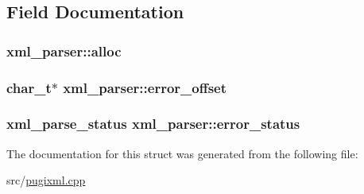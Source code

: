 \subsection{Field Documentation}
\hypertarget{structxml__parser_a213cf019cbf45f5049acdcae296a2976}{
\subsubsection[{alloc}]{ {\bf xml\_\-parser::alloc}}}
\label{structxml__parser_a213cf019cbf45f5049acdcae296a2976}
\hypertarget{structxml__parser_a2476a71cd7e67b3f4bdbcd1323524503}{
\subsubsection[{error\_\-offset}]{\setlength{\rightskip}{0pt plus 5cm}char\_\-t$\ast$ {\bf xml\_\-parser::error\_\-offset}}}
\label{structxml__parser_a2476a71cd7e67b3f4bdbcd1323524503}
\hypertarget{structxml__parser_a0555859911674e5a7a349447d6533383}{
\subsubsection[{error\_\-status}]{\setlength{\rightskip}{0pt plus 5cm}xml\_\-parse\_\-status {\bf xml\_\-parser::error\_\-status}}}
\label{structxml__parser_a0555859911674e5a7a349447d6533383}


The documentation for this struct was generated from the following file:\begin{DoxyCompactItemize}
\item 
src/\hyperlink{pugixml_8cpp}{pugixml.cpp}\end{DoxyCompactItemize}
